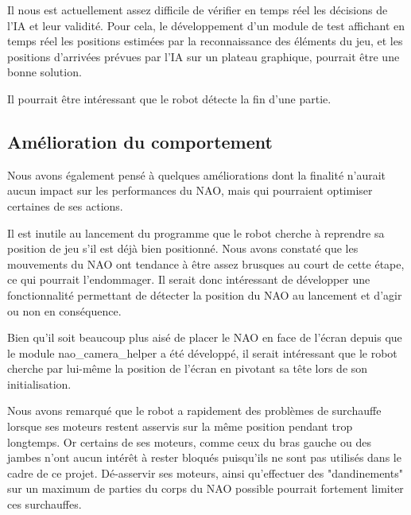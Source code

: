     \par Il nous est actuellement assez difficile de vérifier en temps réel les décisions de l'IA et leur validité.
    Pour cela, le développement d'un module de test affichant en temps réel les positions estimées par la reconnaissance des éléments du jeu, et les positions d'arrivées prévues par l'IA sur un plateau graphique, pourrait être une bonne solution.

    \par Il pourrait être intéressant que le robot détecte la fin d'une partie.


  \subsection{Amélioration du comportement}
  \label{sub:Amélioration du comportement}
    \par Nous avons également pensé à quelques améliorations dont la finalité n'aurait aucun impact sur les performances du NAO, mais qui pourraient optimiser certaines de ses actions.

    \par Il est inutile au lancement du programme que le robot cherche à reprendre sa position de jeu s'il est déjà bien positionné.
    Nous avons constaté que les mouvements du NAO ont tendance à être assez brusques au court de cette étape, ce qui pourrait l'endommager.
    Il serait donc intéressant de développer une fonctionnalité permettant de détecter la position du NAO au lancement et d'agir ou non en conséquence.

    \par Bien qu'il soit beaucoup plus aisé de placer le NAO en face de l'écran depuis que le module nao\_camera\_helper a été développé, il serait intéressant que le robot cherche par lui-même la position de l'écran en pivotant sa tête lors de son initialisation.

    \par Nous avons remarqué que le robot a rapidement des problèmes de surchauffe lorsque ses moteurs restent asservis sur la même position pendant trop longtemps.
    Or certains de ses moteurs, comme ceux du bras gauche ou des jambes n'ont aucun intérêt à rester bloqués puisqu'ils ne sont pas utilisés dans le cadre de ce projet.
    Dé-asservir ses moteurs, ainsi qu'effectuer des "dandinements" sur un maximum de parties du corps du NAO possible pourrait fortement limiter ces surchauffes.
\pagebreak
